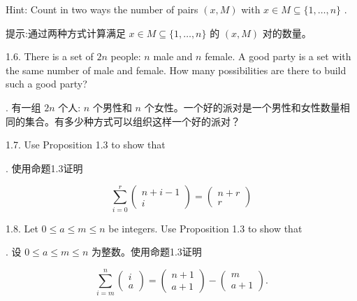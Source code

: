\documentclass[10pt]{article}
\begin{document}
Hint: Count in two ways the number of pairs \(\left( {x,M}\right)\) with \(x \in  M \subseteq  \{ 1,\ldots ,n\}\) .

\begin{tcolorbox}\relax
提示:通过两种方式计算满足 \(x \in  M \subseteq  \{ 1,\ldots ,n\}\) 的 \(\left( {x,M}\right)\) 对的数量。
\end{tcolorbox}

1.6. There is a set of \({2n}\) people: \(n\) male and \(n\) female. A good party is a set with the same number of male and female. How many possibilities are there to build such a good party?

\begin{tcolorbox}. 有一组 \({2n}\) 个人: \(n\) 个男性和 \(n\) 个女性。一个好的派对是一个男性和女性数量相同的集合。有多少种方式可以组织这样一个好的派对？
\end{tcolorbox}

1.7. Use Proposition 1.3 to show that

\begin{tcolorbox}. 使用命题1.3证明
\end{tcolorbox}

\[
\mathop{\sum }\limits_{{i = 0}}^{r}\left( \begin{matrix} n + i - 1 \\  i \end{matrix}\right)  = \left( \begin{matrix} n + r \\  r \end{matrix}\right)
\]

1.8. Let \(0 \leq  a \leq  m \leq  n\) be integers. Use Proposition 1.3 to show that

\begin{tcolorbox}. 设 \(0 \leq  a \leq  m \leq  n\) 为整数。使用命题1.3证明
\end{tcolorbox}

\[
\mathop{\sum }\limits_{{i = m}}^{n}\left( \begin{array}{l} i \\  a \end{array}\right)  = \left( \begin{array}{l} n + 1 \\  a + 1 \end{array}\right)  - \left( \begin{matrix} m \\  a + 1 \end{matrix}\right) .
\]
\end{document}
